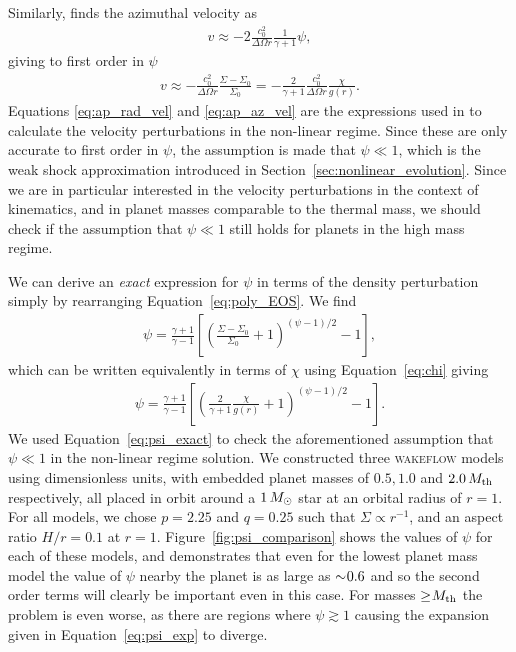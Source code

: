 Similarly, \citet{rafikov2002a} finds the azimuthal velocity as
\begin{align}
    v \approx -2 \frac{c_0^2}{\Delta\Omega r} \frac{1}{\gamma + 1} \psi, \label{eq:v_rafikov}
\end{align}
giving to first order in $\psi$
\begin{align}
    v \approx - \frac{c_0^2}{\Delta \Omega r} \frac{\Sigma - \Sigma_0}{\Sigma_0} = - \frac{2}{\gamma + 1} \frac{c_0^2}{\Delta \Omega r} \frac{\chi}{g(r)}. \label{eq:ap_az_vel}
\end{align}
Equations \eqref{eq:ap_rad_vel} and \eqref{eq:ap_az_vel} are the expressions used in \citet{bollati2021} to calculate the velocity perturbations in the non-linear regime. 
Since these are only accurate to first order in $\psi$, the assumption is made that $\psi \ll 1$, which is the weak shock approximation introduced in Section~\ref{sec:nonlinear_evolution}.
Since we are in particular interested in the velocity perturbations in the context of kinematics, and in planet masses comparable to the thermal mass, we should check if the assumption that $\psi \ll 1$ still holds for planets in the high mass regime.

We can derive an \textit{exact} expression for $\psi$ in terms of the density perturbation simply by rearranging Equation~\eqref{eq:poly_EOS}. We find
\begin{align}
    \psi = \frac{\gamma + 1}{\gamma - 1} \left[ \left( \frac{\Sigma-\Sigma_0}{\Sigma_0} +1  \right)^{(\psi-1)/2}  -1 \right],
\end{align}
which can be written equivalently in terms of $\chi$ using Equation~\eqref{eq:chi} giving
\begin{align}
    \psi = \frac{\gamma + 1}{\gamma - 1} \left[ \left( \frac{2}{\gamma + 1} \frac{\chi}{g(r)} +1  \right)^{(\psi-1)/2} -1 \right]. \label{eq:psi_exact}
\end{align}
We used Equation~\eqref{eq:psi_exact} to check the aforementioned assumption that $\psi \ll 1$ in the non-linear regime solution. 
We constructed three \textsc{wakeflow} models using dimensionless units, with embedded planet masses of $0.5, 1.0$ and $2.0 \, M_{\rm{th}}$ respectively, all placed in orbit around a $1 \, M_{\rm{\odot}}$ star at an orbital radius of $r=1$. 
For all models, we chose $p=2.25$ and $q=0.25$ such that $\Sigma \propto r^{-1}$, and an aspect ratio $H/r=0.1$ at $r=1$. 
Figure~\ref{fig:psi_comparison} shows the values of $\psi$ for each of these models, and demonstrates that even for the lowest planet mass model the value of $\psi$ nearby the planet is as large as $\sim \hspace{-0.23em} 0.6$ and so the second order terms will clearly be important even in this case. 
For masses $\ge \hspace{-0.23em} M_\mathrm{th}$ the problem is even worse, as there are regions where $\psi \gtrsim 1$ causing the expansion given in Equation~\eqref{eq:psi_exp} to diverge.

